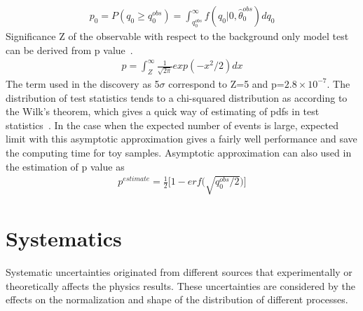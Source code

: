 \begin{align*}
p_{0}=P(q_{0}\geq q_{0}^{obs})=\int^{\infty}_{q_{0}^{obs}}f(q_{0}|0,\hat{\theta}_{0}^{obs})d q_{0}
\end{align*}  
Significance Z of the observable with respect to the background only model test can be derived from p value~\cite{CMS-NOTE-2011-005}.
\begin{align*}
p=\int^{\infty}_{Z}\frac{1}{\sqrt{2\pi}}exp(-x^2/2)dx
\end{align*}  
The term used in the discovery as 5$\sigma$ correspond to Z=5 and p=$2.8\times10^{-7}$. The distribution of test statistics tends to  a chi-squared distribution as according to the Wilk's theorem, which gives a quick way of estimating of pdfs in test statistics~\cite{LHCstaticstics}. In the case when the expected number of events is large, expected limit with this asymptotic approximation gives a fairly well performance and save the computing time for toy samples. Asymptotic approximation can also used in the estimation of p value as
\begin{align*}
p^{estimate}=\frac{1}{2}\bigg[1-erf\bigg(\sqrt{q_{0}^{obs}/2}\bigg)\bigg]
\end{align*}  



\section{Systematics}
Systematic uncertainties originated from different sources that experimentally or theoretically affects the physics results. These uncertainties are considered by the effects on the normalization and shape of the distribution of different processes. 

